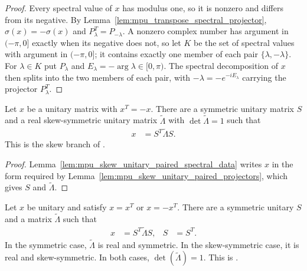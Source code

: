 \begin{proof}\leanok
    Every spectral value of $x$ has modulus one, so it is nonzero and differs
    from its negative. By
    Lemma~\ref{lem:mpu_transpose_spectral_projector}, $\sigma(x)=-\sigma(x)$
    and $P_\lambda^T=P_{-\lambda}$. A nonzero complex number has argument in
    $(-\pi,0]$ exactly when its negative does not, so let $K$ be the set of
    spectral values with argument in $(-\pi,0]$; it contains exactly one
    member of each pair $\{\lambda,-\lambda\}$. For $\lambda\in K$ put
    $P_\lambda$ and $E_\lambda=-\arg\lambda\in[0,\pi)$. The spectral
    decomposition of $x$ then splits into the two members of each pair, with
    $-\lambda=-e^{-iE_\lambda}$ carrying the projector $P_\lambda^T$.
\end{proof}

\begin{lemma}
    \label{lem:mpu_skew_unitary_congruence}
    \leanok
    Let $x$ be a unitary matrix with $x^T=-x$. There are a symmetric unitary
    matrix $S$ and a real skew-symmetric unitary matrix $\widetilde\Lambda$
    with $\det\widetilde\Lambda=1$ such that
    \begin{align}
        x & = S^T\widetilde\Lambda S.
    \end{align}
    This is the skew branch of
    \cite[Lemma~\texttt{lemma:conjclass-normalform-continuous}]{Cirac2017MPU}.
\end{lemma}

\begin{proof}\leanok
    Lemma~\ref{lem:mpu_skew_unitary_paired_spectral_data} writes $x$ in the
    form required by Lemma~\ref{lem:mpu_skew_unitary_paired_projectors}, which
    gives $S$ and $\widetilde\Lambda$.
\end{proof}

\begin{lemma}
    \label{lemma:conjclass-normalform-continuous}
    \leanok
    Let $x$ be unitary and satisfy $x=x^T$ or $x=-x^T$. There are a symmetric
    unitary $S$ and a matrix $\widetilde\Lambda$ such that
    \begin{align}
        x & =S^T\widetilde\Lambda S, & S & =S^T.
    \end{align}
    In the symmetric case, $\widetilde\Lambda$ is real and symmetric. In the
    skew-symmetric case, it is real and skew-symmetric. In both cases,
    $\det(\widetilde\Lambda)=1$. This is
    \cite[Lemma~\texttt{lemma:conjclass-normalform-continuous}]{Cirac2017MPU}.
\end{lemma}

